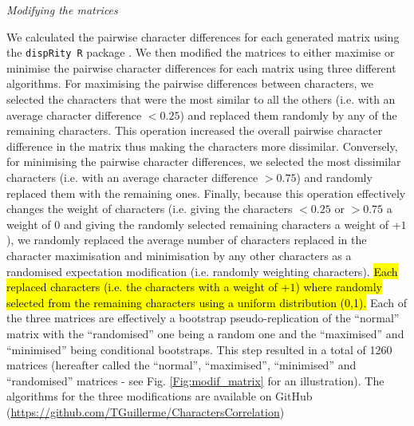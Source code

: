\documentclass[12pt,letterpaper]{article}
\renewcommand{\subsection}[1]{%
\bigskip
\begin{center}
\begin{large}
\normalfont\itshape #1
\end{large}
\end{center}}
\begin{document}
\subsection{Modifying the matrices}
We calculated the pairwise character differences for each generated matrix using the \texttt{dispRity R} package \citep{thomas_guillerme_2016_55646}.
We then modified the matrices to either maximise or minimise the pairwise character differences for each matrix using three different algorithms.
For maximising the pairwise differences between characters, we selected the characters that were the most similar to all the others (i.e. with an average character difference $<0.25$) and replaced them randomly by any of the remaining characters.
This operation increased the overall pairwise character difference in the matrix thus making the characters more dissimilar.
Conversely, for minimising the pairwise character differences, we selected the most dissimilar characters (i.e. with an average character difference $>0.75$) and randomly replaced them with the remaining ones.
Finally, because this operation effectively changes the weight of characters (i.e. giving the characters $<0.25$ or $>0.75$ a weight of $0$ and giving the randomly selected remaining characters a weight of +$1$), we randomly replaced the average number of characters replaced in the character maximisation and minimisation by any other characters as a randomised expectation modification (i.e. randomly weighting characters).
\hl{Each replaced characters (i.e. the characters with a weight of +$1$) where randomly selected from the remaining characters using a uniform distribution (0,1).}
Each of the three matrices are effectively a bootstrap pseudo-replication of the ``normal'' matrix with the ``randomised'' one being a random one and the ``maximised'' and ``minimised'' being conditional bootstraps.
This step resulted in a total of 1260 matrices (hereafter called the ``normal'', ``maximised'', ``minimised'' and ``randomised'' matrices - see Fig. \ref{Fig:modif_matrix} for an illustration).
The algorithms for the three modifications are available on GitHub (\url{https://github.com/TGuillerme/CharactersCorrelation})
\end{document}
